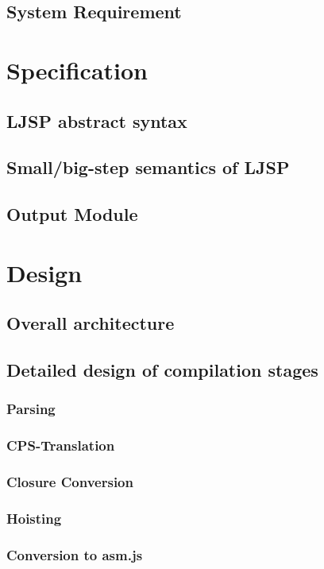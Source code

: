 \documentclass[11pt]{report}
\begin{document}
\section{System Requirement}

\chapter{Specification}
\section{LJSP abstract syntax}
\section{Small/big-step semantics of LJSP}
\section{Output Module}

\chapter{Design}
\section{Overall architecture}
\section{Detailed design of compilation stages}
\subsection{Parsing}
\subsection{CPS-Translation}
\subsection{Closure Conversion}
\subsection{Hoisting}
\subsection{Conversion to asm.js}
\end{document}
